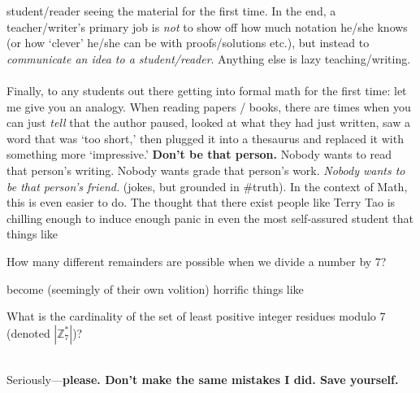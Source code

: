 \documentclass[10pt]{article}
\newcommand\ZZ{{\mathbb Z}}
\theoremstyle{definition}
\begin{document}
{student/reader seeing the material for the first time.  In the end, a
teacher/writer's primary job is \emph{not} to show off how much
notation he/she knows (or how `clever' he/she can be with
proofs/solutions etc.), but instead to \emph{communicate an idea to a
  student/reader}.  Anything else is lazy teaching/writing.  \\~\\
Finally, to any students out there getting into formal math for the
first time: let me give you an analogy.  When reading papers / books,
there are times when you can just \emph{tell} that the author paused,
looked at what they had just written, saw a word that was `too short,'
then plugged it into a thesaurus and replaced it with something more
`impressive.'  \textbf{Don't be that person.}  Nobody wants to read
that person's writing.  Nobody wants grade that person's work.
\emph{Nobody wants to be that person's friend.} (jokes, but grounded
in \#truth).  In the context of Math, this is even easier to do.  The
thought that there exist people like Terry Tao is chilling enough to
induce enough panic in even the most self-assured student that things
like
\begin{center}
How many different remainders are possible when we divide a number by 7?
\end{center}
become (seemingly of their own volition) horrific things like \\
\begin{adjustwidth}{.05\linewidth}{}
What is the cardinality of the set of least positive integer residues
modulo 7 (denoted $|\ZZ_7^*|$)?
\end{adjustwidth}~\\
Seriously---\textbf{please.  Don't make the same mistakes I did.  Save yourself.}
}
\end{document}
